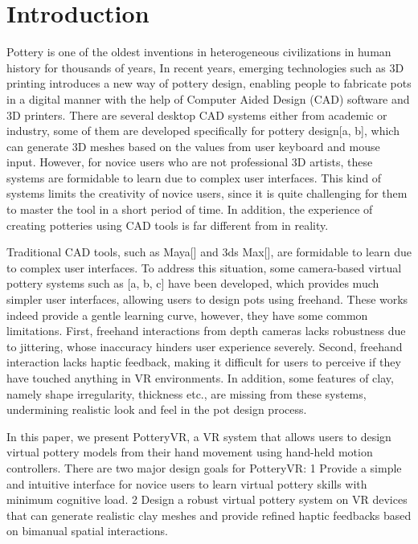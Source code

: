 \section{Introduction}
\label{sec:1}
Pottery is one of the oldest inventions in heterogeneous civilizations in human history for thousands of years, 
In recent years, emerging technologies such as 3D printing introduces a new way of pottery design, enabling people to fabricate pots in a digital manner with the help of Computer Aided Design (CAD) software and 3D printers.
There are several desktop CAD systems either from academic or industry, some of them are developed specifically for pottery design[a, b], which can generate 3D meshes based on the values from user keyboard and mouse input.
However, for novice users who are not professional 3D artists, these systems are formidable to learn due to complex user interfaces. 
This kind of systems limits the creativity of novice users, since it is quite challenging for them to master the tool in a short period of time.
In addition, the experience of creating potteries using CAD tools is far different from in reality.

Traditional CAD tools, such as Maya[] and 3ds Max[], are formidable to learn due to complex user interfaces.
To address this situation, some camera-based virtual pottery systems such as [a, b, c] have been developed, which provides much simpler user interfaces, allowing users to design pots using freehand.
These works indeed provide a gentle learning curve, however, they have some common limitations.
First, freehand interactions from depth cameras lacks robustness due to jittering, whose inaccuracy hinders user experience severely.
Second, freehand interaction lacks haptic feedback, making it difficult for users to perceive if they have touched anything in VR environments.
In addition, some features of clay, namely shape irregularity, thickness etc., are missing from these systems, undermining realistic look and feel in the pot design process.

In this paper, we present PotteryVR, a VR system that allows users to design virtual pottery models from their hand movement using hand-held motion controllers. There are two major design goals for PotteryVR:
1 Provide a simple and intuitive interface for novice users to learn virtual pottery skills with minimum cognitive load.
2 Design a robust virtual pottery system on VR devices that can generate realistic clay meshes and provide refined haptic feedbacks based on bimanual spatial interactions.

